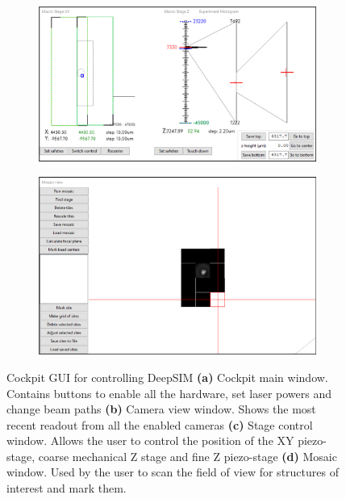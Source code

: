 \begin{figure}[h]
	\begin{subfigure}[t]{0.51\textwidth}
		\centering
		\includegraphics[width=\linewidth]{images/cockpit_GUI_stage.png}
		\caption{}
		\label{fig:DeepSIM_control_software_stage_control}
	\end{subfigure}
	\begin{subfigure}[t]{0.445\textwidth}
		\centering
		\includegraphics[width=\linewidth]{images/cockpit_GUI_mosaic.png}
		\caption{}
		\label{fig:DeepSIM_control_software_mosaic}
	\end{subfigure}
	\caption[Cockpit GUI for controlling DeepSIM]{Cockpit GUI for controlling DeepSIM \textbf{(a)} Cockpit main window. Contains buttons to enable all the hardware, set laser powers and change beam paths \textbf{(b)} Camera view window. Shows the most recent readout from all the enabled cameras \textbf{(c)} Stage control window. Allows the user to control the position of the XY piezo-stage, coarse mechanical Z stage and fine Z piezo-stage \textbf{(d)} Mosaic window. Used by the user to scan the field of view for structures of interest and mark them.}
	\label{fig:Cockpit_UI}
\end{figure}

